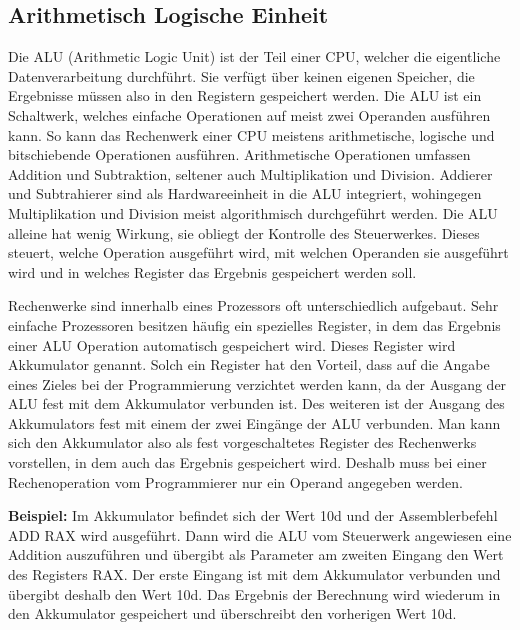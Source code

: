\documentclass[12pt]{article}
\begin{document}
\subsection{Arithmetisch Logische Einheit} \label{subsec:alu}
Die ALU (Arithmetic Logic Unit) ist der Teil einer CPU, welcher die eigentliche Datenverarbeitung durchführt. Sie verfügt über keinen eigenen Speicher, die Ergebnisse müssen also in den Registern gespeichert werden. Die ALU ist ein Schaltwerk, welches einfache Operationen auf meist zwei Operanden ausführen kann. So kann das Rechenwerk einer CPU meistens arithmetische, logische und bitschiebende Operationen ausführen. Arithmetische Operationen umfassen Addition und Subtraktion, seltener auch Multiplikation und Division. Addierer und Subtrahierer sind als Hardwareeinheit in die ALU integriert, wohingegen Multiplikation und Division meist algorithmisch durchgeführt werden. Die ALU alleine hat wenig Wirkung, sie obliegt der Kontrolle des Steuerwerkes. Dieses steuert, welche Operation ausgeführt wird, mit welchen Operanden sie ausgeführt wird und in welches Register das Ergebnis gespeichert werden soll.

\par \bigskip
\noindent Rechenwerke sind innerhalb eines Prozessors oft unterschiedlich aufgebaut. 
Sehr einfache Prozessoren besitzen häufig ein spezielles Register, in dem das Ergebnis einer ALU Operation automatisch gespeichert wird. Dieses Register wird Akkumulator genannt. Solch ein Register hat den Vorteil, dass auf die Angabe eines Zieles bei der Programmierung verzichtet werden kann, da der Ausgang der ALU fest mit dem Akkumulator verbunden ist. Des weiteren ist der Ausgang des Akkumulators fest mit einem der zwei Eingänge der ALU verbunden. Man kann sich den Akkumulator also als fest vorgeschaltetes Register des Rechenwerks vorstellen, in dem auch das Ergebnis gespeichert wird. Deshalb muss bei einer Rechenoperation vom Programmierer nur ein Operand angegeben werden. 

\par\bigskip\noindent \textbf{Beispiel:} Im Akkumulator befindet sich der Wert 10d  und der Assemblerbefehl ADD RAX wird ausgeführt. Dann wird die ALU vom Steuerwerk angewiesen eine Addition auszuführen und übergibt als Parameter am zweiten Eingang den Wert des Registers RAX. Der erste Eingang ist mit dem Akkumulator verbunden und übergibt deshalb den Wert 10d. Das Ergebnis der Berechnung wird wiederum in den Akkumulator gespeichert und überschreibt den vorherigen Wert 10d.  
\end{document}

